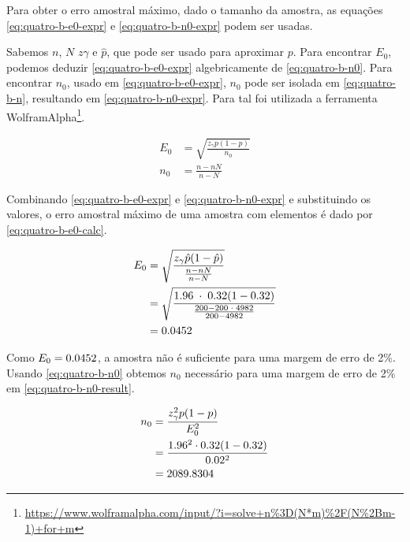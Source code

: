 Para obter o erro amostral máximo, dado o tamanho da amostra, as equações \eqref{eq:quatro-b-e0-expr} e \eqref{eq:quatro-b-n0-expr} podem ser usadas. 

Sabemos $n$, $N$ $z\gamma$ e $\hat{p}$, que pode ser usado para aproximar $p$. Para encontrar $E_0$, podemos deduzir \eqref{eq:quatro-b-e0-expr} algebricamente de \eqref{eq:quatro-b-n0}. Para encontrar $n_0$, usado em \eqref{eq:quatro-b-e0-expr}, $n_0$ pode ser isolada em \eqref{eq:quatro-b-n}, resultando em \eqref{eq:quatro-b-n0-expr}. Para tal foi utilizada a ferramenta WolframAlpha\footnote{\url{https://www.wolframalpha.com/input/?i=solve+n\%3D(N*m)\%2F(N\%2Bm-1)+for+m}}.

\begin{align}
	E_0 &= \label{eq:quatro-b-e0-expr}
	       \sqrt{\frac{z_\gamma p(1 - p) }{n_0}} \\
	n_0 &= \label{eq:quatro-b-n0-expr}
	       \frac{n-n N}{n-N}
\end{align}

Combinando \eqref{eq:quatro-b-e0-expr} e \eqref{eq:quatro-b-n0-expr} e substituindo os valores, o erro amostral máximo de uma amostra com \QUATROn elementos é dado por \eqref{eq:quatro-b-e0-calc}.

\begin{align}
	\label{eq:quatro-b-e0-calc}
	E_0 &= \sqrt{\frac{z_\gamma \hat{p}(1 - \hat{p}) }{\frac{n-n N}{n - N}}} \\
	    &= \sqrt{\frac{1.96 \;\cdot\; 0.32 (1 - 0.32) }{\frac{200 - 200 \;\cdot\; 4982}{200 - 4982}}} \nonumber \\
	    &= 0.0452 \nonumber
\end{align}

Como $E_0 = 0.0452$, a amostra não é suficiente para uma margem de erro de 2\%. Usando \eqref{eq:quatro-b-n0} obtemos $n_0$ necessário para uma margem de erro de 2\% em \eqref{eq:quatro-b-n0-result}.

\begin{align}
	n_0 &= \frac{z_\gamma^2 p(1-p)}{E_0^2} \nonumber \\
	    &= \frac{1.96^2 \cdot 0.32(1-0.32)}{0.02^2} \nonumber \\
	    &= \label{eq:quatro-b-n0-result}
	       2089.8304	
\end{align}

